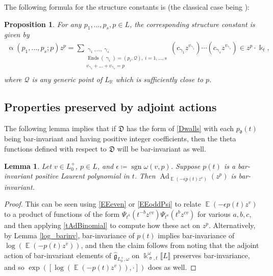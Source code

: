 \documentclass{amsart}
\DeclareMathOperator{\sign}{sgn}
\DeclareMathOperator{\Ends}{Ends}
\DeclareMathOperator{\EE}{\mathbb{E}}
\DeclareMathOperator{\Ad}{Ad}
\let\llb=\llbracket
\let\rrb=\rrbracket
\let\bb=\mathbb
\let\f=\mathfrak
\newcommand {\kk} {\Bbbk}
\newcommand {\kt} {\kk_t}
\newcommand {\sQ} {\mathcal{Q}}
\renewcommand{\alpha}{\upalpha}
\renewcommand{\gamma}{\upgamma}
\renewcommand{\sigma}{\upsigma}
\theoremstyle{plain}%
\newtheorem{lem}[thm]{Lemma}
\newtheorem{prop}[thm]{Proposition}
\theoremstyle{definition}
\theoremstyle{remark}
\begin{document}
The following formula for the structure constants is \cite[Prop. 2.15]{Man3} (the classical case being \cite[Prop 6.4(3)]{GHKK}):
\begin{prop}\label{StructureConstants}
For any $p_1,\ldots,p_s,p\in L$, the corresponding structure constant is given by 
\begin{align}\label{alpha}
 \alpha(p_1,\ldots,p_s;p)z^p= \sum_{\substack{\gamma_1,\ldots,\gamma_s \\
    	               \Ends(\gamma_i)=(p_i,\sQ), \medspace i=1,\ldots,s \\
		                v_{\gamma_1}+\ldots+v_{\gamma_s} = p \\
		                }}
	                (c_{\gamma_1}z^{v_{\gamma_1}}) \cdots (c_{\gamma_s}z^{v_{\gamma_s}}) \in z^p\cdot \kt,
\end{align}
where $\sQ$ is any generic point of $L_{\bb{R}}$ which is sufficiently close to $p$.
\end{prop}


\subsection{Properties preserved by adjoint actions}\label{AdPres}

The following lemma implies that if $\f{D}$ has the form of \eqref{Dwalls} with each $p_{\f{d}}(t)$ being bar-invariant and having positive integer coefficients, then the theta functions defined with respect to $\f{D}$ will be bar-invariant as well. 

\begin{lem}\label{bar_prop}
Let $v\in L_0^+$, $p\in L$, and $\epsilon\coloneqq \sign\omega(v,p)$.  Suppose $p(t)$ is a bar-invariant positive Laurent polynomial in $t$.  Then $\Ad_{\EE\left(-\epsilon p(t)z^v\right)}(z^p)$ is bar-invariant.
\end{lem}
\begin{proof}
This can be seen using \eqref{EEeven} or \eqref{EEoddPsi} to relate $\EE(- \epsilon p(t)z^v)$ to a product of functions of the form $\Psi_{t^a}(t^{-b}z^{cv})\Psi_{t^a}(t^bz^{cv})$ for various $a,b,c$, and then applying \eqref{tAdBinomial} to compute how these act on $z^p$.  Alternatively, by Lemma \ref{log_barinv}, bar-invariance of $p(t)$ implies bar-invariance of $\log(\EE\left(- p(t)z^v\right))$, and then the claim follows from noting that the adjoint action of bar-invariant elements of $\hat{\f{g}}_{L_0^+,\omega}$ on $\kk_{\sigma,t}^{\omega}\llb L\rrb$ preserves bar-invariance, and so $\exp([\log(\EE(-p(t)z^v)),\cdot])$ does as well.
\end{proof}
\end{document}
